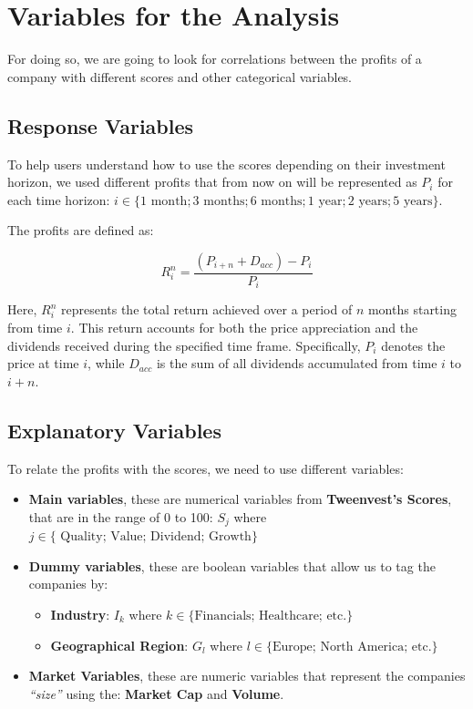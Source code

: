 \documentclass[11pt,english,a4paper,hidelinks]{book}
\begin{document}
\section{Variables for the Analysis}

For doing so, we are going to look for correlations between the profits of a company with different scores and other categorical variables.

\subsection{Response Variables}
To help users understand how to use the scores depending on their investment horizon, we used different profits that from now on will be represented as \(P_i\) for each time horizon: \(i \in \{1 \text{ month}; 3 \text{ months}; 6 \text{ months}; 1 \text{ year}; 2 \text{ years}; 5 \text{ years}\}\).

\vspace{0.5cm}
\noindent The profits are defined as:

\begin{equation}
    R_i^n = \frac{(P_{i+n} + D_{acc}) - P_{i}}{P_{i}}
\end{equation}

\noindent Here, \(R_i^n\) represents the total return achieved over a period of \(n\) months starting from time \(i\). This return accounts for both the price appreciation and the dividends received during the specified time frame. Specifically, \(P_i\) denotes the price at time \(i\), while \(D_{acc}\) is the sum of all dividends accumulated from time \(i\) to \(i+n\).


\subsection{Explanatory Variables}
To relate the profits with the scores, we need to use different variables:
\begin{itemize}
    \item \textbf{Main variables}, these are numerical variables from \textbf{Tweenvest's Scores}, that are in the range of 0 to 100: \(S_j\) where   \(j \in \{\text{ Quality; Value; Dividend; Growth}\}\)
    \item \textbf{Dummy variables}, these are boolean variables that allow us to tag the companies by:
    \begin{itemize}
        \item \textbf{Industry}: \(I_k\) where \(k \in \{\text{Financials; Healthcare; etc.}\}\)
        \item \textbf{Geographical Region}: \(G_l\) where \(l \in \{\text{Europe; North America; etc.}\}\)
    \end{itemize}
    \item \textbf{Market Variables}, these are numeric variables that represent the companies \textit{``size''} using the: \textbf{Market Cap} and \textbf{Volume}.
\end{itemize}
\end{document}
